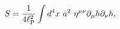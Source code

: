 \begin{equation}
S = \frac{1}{ 4 \ell_{\rm P}^2}\int d^4 x ~a^2~ \eta^{\mu\nu} \partial_{\mu} h
\partial_{\nu} h ,
\label{ac1} 
\end{equation}

